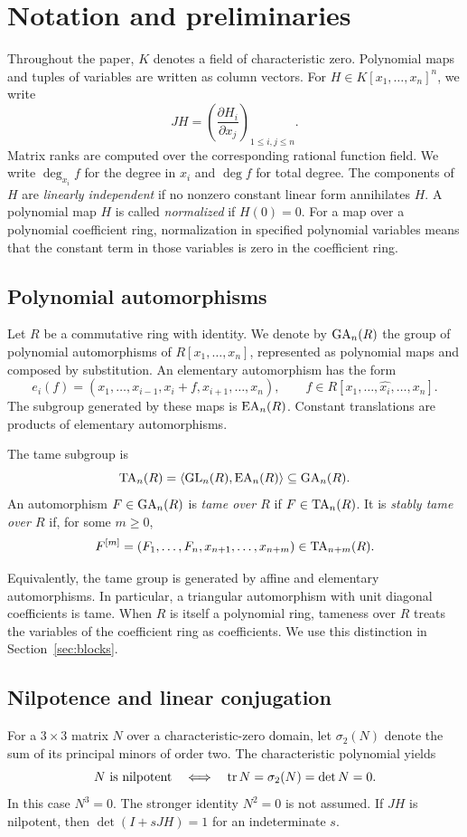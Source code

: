 \section{Notation and preliminaries}\label{sec:preliminaries}

Throughout the paper, $K$ denotes a field of characteristic zero. Polynomial maps and tuples of variables are written as column vectors. For $H\in K[x_1,\ldots,x_n]^n$, we write
\[
 JH=\left(\frac{\partial H_i}{\partial x_j}\right)_{1\leq i,j\leq n}.
\]
Matrix ranks are computed over the corresponding rational function field. We write $\deg_{x_i}f$ for the degree in $x_i$ and $\deg f$ for total degree. The components of $H$ are \emph{linearly independent} if no nonzero constant linear form annihilates $H$. A polynomial map $H$ is called \emph{normalized} if $H(0)=0$. For a map over a polynomial coefficient ring, normalization in specified polynomial variables means that the constant term in those variables is zero in the coefficient ring.

\subsection{Polynomial automorphisms}
Let $R$ be a commutative ring with identity. We denote by $\operatorname{GA}_n(R)$ the group of polynomial automorphisms of $R[x_1,\ldots,x_n]$, represented as polynomial maps and composed by substitution. An elementary automorphism has the form
\[
 e_i(f)=(x_1,\ldots,x_{i-1},x_i+f,x_{i+1},\ldots,x_n),
 \qquad f\in R[x_1,\ldots,\widehat{x_i},\ldots,x_n].
\]
The subgroup generated by these maps is $\operatorname{EA}_n(R)$. Constant translations are products of elementary automorphisms.

\begin{definition}\label{def:tame}
The tame subgroup is
\[
 \operatorname{TA}_n(R)=\langle\operatorname{GL}_n(R),\operatorname{EA}_n(R)\rangle\subseteq\operatorname{GA}_n(R).
\]
An automorphism $F\in\operatorname{GA}_n(R)$ is \emph{tame over $R$} if $F\in\operatorname{TA}_n(R)$. It is \emph{stably tame over $R$} if, for some $m\geq0$,
\[
 F^{[m]}=(F_1,\ldots,F_n,x_{n+1},\ldots,x_{n+m})\in\operatorname{TA}_{n+m}(R).
\]
\end{definition}

Equivalently, the tame group is generated by affine and elementary automorphisms. In particular, a triangular automorphism with unit diagonal coefficients is tame. When $R$ is itself a polynomial ring, tameness over $R$ treats the variables of the coefficient ring as coefficients. We use this distinction in Section~\ref{sec:blocks}.

\subsection{Nilpotence and linear conjugation}
For a $3\times3$ matrix $N$ over a characteristic-zero domain, let $\sigma_2(N)$ denote the sum of its principal minors of order two. The characteristic polynomial yields
\begin{equation}\label{eq:nilpotence}
 N\text{ is nilpotent}
 \quad\Longleftrightarrow\quad
 \operatorname{tr} N=\sigma_2(N)=\det N=0.
\end{equation}
In this case $N^3=0$. The stronger identity $N^2=0$ is not assumed. If $JH$ is nilpotent, then $\det(I+sJH)=1$ for an indeterminate $s$.


